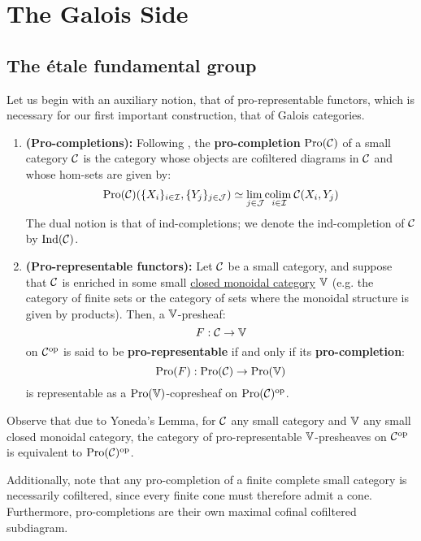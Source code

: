 \section{The Galois Side}
    \subsection{The \'etale fundamental group}
        Let us begin with an auxiliary notion, that of pro-representable functors, which is necessary for our first important construction, that of Galois categories.
        \begin{definition} \label{def: pro_representable_functors}
            \noindent
            \begin{enumerate}
                \item \textbf{(Pro-completions):} Following \cite[Definition 2.1]{isaksen_2001_limits_and_colimits_in_pro_categories}, the \textbf{pro-completion} $\mathrm{Pro}(\mathcal{C})$ of a small category $\mathcal{C}$ is the category whose objects are cofiltered diagrams in $\mathcal{C}$ and whose hom-sets are given by:
                    $$\mathrm{Pro}(\mathcal{C})(\{X_i\}_{i \in \mathcal{I}}, \{Y_j\}_{j \in \mathcal{J}}) \simeq \underset{j \in \mathcal{J}}{\operatorname{lim} \:} \underset{i \in \mathcal{I}}{\operatorname{colim} \:} \mathcal{C}(X_i, Y_j)$$
                The dual notion is that of ind-completions; we denote the ind-completion of $\mathcal{C}$ by $\mathrm{Ind}(\mathcal{C})$.
                \item \textbf{(Pro-representable functors):} Let $\mathcal{C}$ be a small category, and suppose that $\mathcal{C}$ is enriched in some small \href{http://nlab-pages.s3.us-east-2.amazonaws.com/nlab/show/closed+monoidal+category}{\underline{closed monoidal category}} $\mathbb{V}$ (e.g. the category of finite sets or the category of sets where the monoidal structure is given by products). Then, a $\mathbb{V}$-presheaf:
                    $$F: \mathcal{C} \to \mathbb{V}$$
                on $\mathcal{C}^{\mathrm{op}}$ is said to be \textbf{pro-representable} if and only if its \textbf{pro-completion}:
                    $$\mathrm{Pro}(F): \mathrm{Pro}(\mathcal{C}) \to \mathrm{Pro}(\mathbb{V})$$
                is representable as a $\mathrm{Pro}(\mathbb{V})$-copresheaf on $\mathrm{Pro}(\mathcal{C})^{\mathrm{op}}$.
            \end{enumerate}
        \end{definition}
        \begin{remark} \label{remark: pro_representable_functors_are_ind_objects}
            Observe that due to Yoneda's Lemma, for $\mathcal{C}$ any small category and $\mathbb{V}$ any small closed monoidal category, the category of pro-representable $\mathbb{V}$-presheaves on $\mathcal{C}^{\mathrm{op}}$ is equivalent to $\mathrm{Pro}(\mathcal{C})^{\mathrm{op}}$.
            
            Additionally, note that any pro-completion of a finite complete small category is necessarily cofiltered, since every finite cone must therefore admit a cone. Furthermore, pro-completions are their own maximal cofinal cofiltered subdiagram.
        \end{remark}
        

